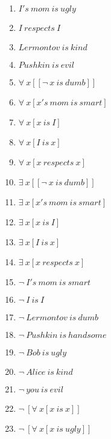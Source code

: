 \documentclass{article}
\begin{document}
\begin{enumerate}
\item $I's \ mom \ is \ ugly$

\item $I \ respects \ I$

\item $Lermontov \ is \ kind$

\item $Pushkin \ is \ evil$

\item $\forall \ x[[\neg \ x \ is \ dumb]]$

\item $\forall \ x[x's \ mom \ is \ smart]$

\item $\forall \ x[x \ is \ I]$

\item $\forall \ x[I \ is \ x]$

\item $\forall \ x[x \ respects \ x]$

\item $\exists \ x[[\neg \ x \ is \ dumb]]$

\item $\exists \ x[x's \ mom \ is \ smart]$

\item $\exists \ x[x \ is \ I]$

\item $\exists \ x[I \ is \ x]$

\item $\exists \ x[x \ respects \ x]$

\item $\neg \ I's \ mom \ is \ smart$

\item $\neg \ I \ is \ I$

\item $\neg \ Lermontov \ is \ dumb$

\item $\neg \ Pushkin \ is \ handsome$

\item $\neg \ Bob \ is \ ugly$

\item $\neg \ Alice \ is \ kind$

\item $\neg \ you \ is \ evil$

\item $\neg \ [\forall \ x[x \ is \ x]]$

\item $\neg \ [\forall \ x[x \ is \ ugly]]$


\end{enumerate}
\end{document}
